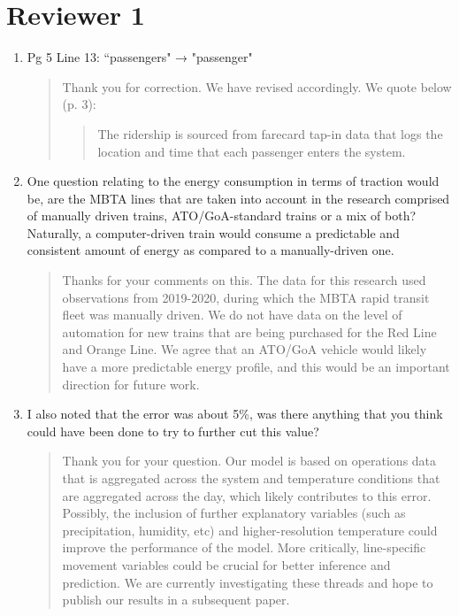 \documentclass[11pt,twoside]{article}
\numberwithin{equation}{section}
\newcommand{\?}{\stackrel{?}{=}}
\newcommand{\bl}{\color{blue}}
\newcommand{\gr}{\color{green!40!black}}
\begin{document}
\section*{Reviewer 1}
\begin{enumerate}[1)]
\item Pg 5 Line 13: ``passengers" → "passenger"  
\begin{quote}
\bl
Thank you for correction. We have revised accordingly. We quote below (p. 3): 
\begin{quote}
    \gr The ridership is sourced from farecard tap-in data that logs the location and time that
each passenger enters the system.
\end{quote}
\end{quote}

\item One question relating to the energy consumption in terms of traction would be, are the MBTA lines that are taken into account in the research comprised of manually driven trains, ATO/GoA-standard trains or a mix of both? Naturally, a computer-driven train would consume a predictable and consistent amount of energy as compared to a manually-driven one.
\begin{quote}
\bl Thanks for your comments on this.  The data for this research used observations from 2019-2020, during which the MBTA rapid transit fleet was manually driven.  We do not have data on the level of automation for new trains that are being purchased for the Red Line and Orange Line.  We agree that an ATO/GoA vehicle would likely have a more predictable energy profile, and this would be an important direction for future work.
\end{quote}

\item I also noted that the error was about 5\%, was there anything that you think could have been done to try to further cut this value?  
\begin{quote}
\bl
Thank you for your question. Our model is based on operations data that is aggregated across the system and temperature conditions that are aggregated across the day, which likely contributes to this error. Possibly, the inclusion of further explanatory variables (such as precipitation, humidity, etc) and higher-resolution temperature could improve the performance of the model. More critically, line-specific movement variables could be crucial for better inference and prediction. We are currently investigating these threads and hope to publish our results in a subsequent paper.
\end{quote}
\end{enumerate}
\end{document}
